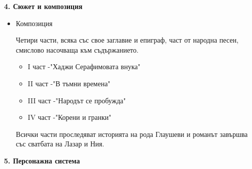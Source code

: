 \documentclass[12pt,a4paper]{article}
\begin{document}
\textbf{4. Сюжет и композиция}
\vspace{-0.30cm}
 
\begin{itemize}
    \item Композиция
     
    \hspace*{0.5cm} Четири части, всяка със свое заглавие и епиграф, част от народна песен, смислово насочваща към съдържанието.
    \begin{itemize}
        \item I част -"Хаджи Серафимовата внука"
        \item II част -"В тъмни времена"
        \item III част -"Народът се пробужда"
        \item IV част -"Корени и гранки"
    \end{itemize}
     
    \hspace*{0.5cm} Всички части проследяват историята на рода Глаушеви и романът завършва със сватбата на Лазар и Ния.
\end{itemize}
\vspace{0.1cm}
 
\textbf{5. Персонажна система}
\vspace{-0.30cm}
 
\end{document}

